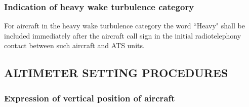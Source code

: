 \documentclass[../vATM.tex]{subfiles}
\begin{document}
    \subsubsection{Indication of heavy wake turbulence category}

    For aircraft in the heavy wake turbulence category the word ``Heavy" shall be included immediately after the aircraft call sign in the initial radiotelephony contact between such aircraft and ATS units.

    \subsection[Altimeter setting procedures]{ALTIMETER SETTING PROCEDURES}

    \subsubsection{Expression of vertical position of aircraft}
\end{document}
